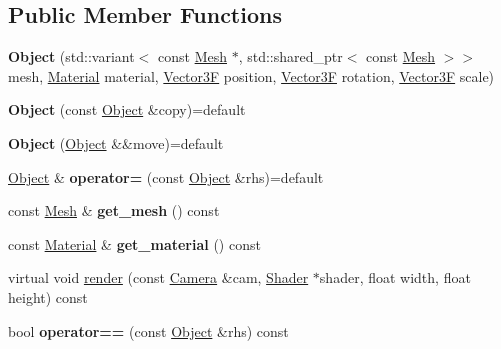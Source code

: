 \subsection*{Public Member Functions}
\begin{DoxyCompactItemize}
\item 
\mbox{\label{class_object_a3852f892594a227653d27b36863b5532}} 
{\bfseries Object} (std\+::variant$<$ const \mbox{\hyperlink{class_mesh}{Mesh}} $\ast$, std\+::shared\+\_\+ptr$<$ const \mbox{\hyperlink{class_mesh}{Mesh}} $>$$>$ mesh, \mbox{\hyperlink{class_material}{Material}} material, \mbox{\hyperlink{class_vector3}{Vector3F}} position, \mbox{\hyperlink{class_vector3}{Vector3F}} rotation, \mbox{\hyperlink{class_vector3}{Vector3F}} scale)
\item 
\mbox{\label{class_object_aaf7dbf04988a46659eca5769c5839e7b}} 
{\bfseries Object} (const \mbox{\hyperlink{class_object}{Object}} \&copy)=default
\item 
\mbox{\label{class_object_abc302f6a98cea6288dfee35571485c48}} 
{\bfseries Object} (\mbox{\hyperlink{class_object}{Object}} \&\&move)=default
\item 
\mbox{\label{class_object_adc33f671dea9d1e734a2e7991477a004}} 
\mbox{\hyperlink{class_object}{Object}} \& {\bfseries operator=} (const \mbox{\hyperlink{class_object}{Object}} \&rhs)=default
\item 
\mbox{\label{class_object_a7a375f5199dd4508699322a6f18d608d}} 
const \mbox{\hyperlink{class_mesh}{Mesh}} \& {\bfseries get\+\_\+mesh} () const
\item 
\mbox{\label{class_object_a7ed0e8152bdbedc7b289bb6f5d36fa6d}} 
const \mbox{\hyperlink{class_material}{Material}} \& {\bfseries get\+\_\+material} () const
\item 
virtual void \mbox{\hyperlink{class_object_adb2402094daa6f7e392c47236d7fef61}{render}} (const \mbox{\hyperlink{class_camera}{Camera}} \&cam, \mbox{\hyperlink{class_shader}{Shader}} $\ast$shader, float width, float height) const
\item 
\mbox{\label{class_object_adf4c88351ab218071f5dfc3f111c9a9f}} 
bool {\bfseries operator==} (const \mbox{\hyperlink{class_object}{Object}} \&rhs) const
\end{DoxyCompactItemize}
